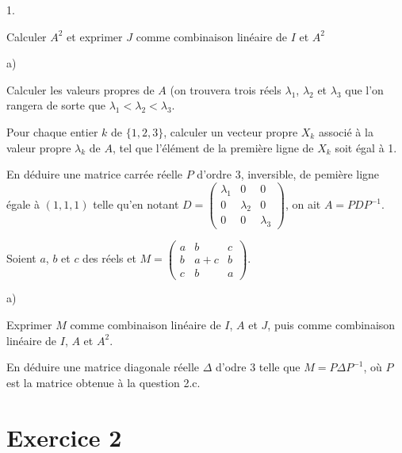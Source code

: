 \documentclass[11pt]{article}%
\begin{document}
\begin{noliste}{1.}
 \setlength{\itemsep}{4mm}
\item Calculer $A^{2}$ et exprimer $J$ comme combinaison linéaire de
$I$
et $A^{2}$

\item 
\begin{noliste}{a)}
 \setlength{\itemsep}{2mm}
\item Calculer les valeurs propres de $A$ (on trouvera trois réels
$\lambda_{1}$, $\lambda_{2}$ et $\lambda_{3}$ que l'on rangera de sorte
que $\lambda_{1}<\lambda_{2}<\lambda_{3}$.

\item Pour chaque entier $k$ de $\{1,2,3\}$, calculer un vecteur propre
$X_{k}$ associé à la valeur propre $\lambda_{k}$ de $A$, tel que
l'élément de la première ligne de $X_{k}$ soit égal à 1.

\item En déduire une matrice carrée réelle $P$ d'ordre 3,
inversible, de pemière ligne égale à $(1,1,1)$ telle qu'en
notant $D = \left( 
\begin{array}{ccc}
\lambda_{1} & 0 & 0 \\
0 & \lambda_{2} & 0 \\
0 & 0 & \lambda_{3}
\end{array}
\right) $, on ait $A = PDP^{-1}$.
\end{noliste}

\item Soient $a$, $b$ et $c$ des réels et $M = \left( 
\begin{array}{ccc}
a & b & c \\
b & a + c & b \\
c & b & a
\end{array}
\right) $.

\begin{noliste}{a)}
 \setlength{\itemsep}{2mm}
\item Exprimer $M$ comme combinaison linéaire de $I$, $A$ et $J$, puis
comme combinaison linéaire de $I$, $A$ et $A^{2}$.

\item En déduire une matrice diagonale réelle $\Delta $ d'odre 3
telle que $M = P\Delta P^{-1}$, où $P$ est la matrice obtenue à la
question 2.c.
\end{noliste}
\end{noliste}

\section*{Exercice 2}
\end{document}
